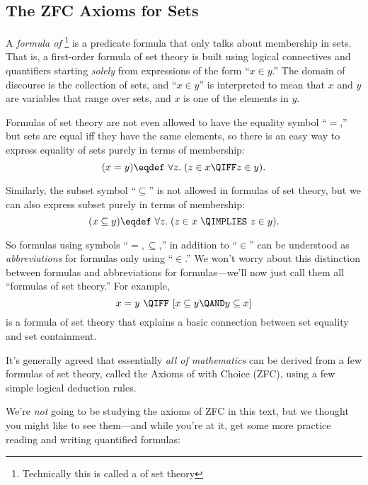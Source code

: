 \subsection{The ZFC Axioms for Sets}\label{ZFC_sec}

A \emph{formula of }\footnote{Technically this is
  called a  of set theory} is a predicate
formula that only talks about membership in sets.  That is, a
first-order formula of set theory is built using logical connectives
and quantifiers starting \emph{solely} from expressions of the form ``$x\in
y$.''  The domain of discourse is the collection of sets, and ``$x \in
y$'' is interpreted to mean that $x$ and $y$ are variables that range
over sets, and $x$ is one of the elements in $y$.

Formulas of set theory are not even allowed to have the equality
symbol ``$=$,'' but sets are equal iff they have the same elements, so
there is an easy way to express equality of sets purely in terms of
membership:
\begin{equation}\label{xsetequaly}
(x = y) \eqdef\  \forall z.\; (z \in x \QIFF z \in y).
\end{equation}

Similarly, the subset symbol ``$\subseteq$'' is not allowed in
formulas of set theory, but we can also express subset purely in terms
of membership:
\begin{equation}\label{xsubeqy}
(x \subseteq y) \eqdef\ \forall z.\; (z \in x\ \QIMPLIES\ z \in y).
\end{equation}

So formulas using symbols ``$=,\subseteq$,'' in addition to ``$\in$''
can be understood as \emph{abbreviations} for formulas only using
``$\in$.''  We won't worry about this distinction between formulas and
abbreviations for formulas---we'll now just call them all ``formulas of
set theory.''  For example,
\[
x= y\ \QIFF\ [x \subseteq y \QAND y \subseteq x]
\]
is a formula of set theory that explains a basic connection between
set equality and set containment.

It's generally agreed that essentially \emph{all of mathematics} can
be derived from a few formulas of set theory, called the Axioms of
 with Choice (ZFC), using a few
simple logical deduction rules.


We're \emph{not} going to be studying the axioms of ZFC in this text,
but we thought you might like to see them---and while you're at it,
get some more practice reading and writing quantified formulas:

